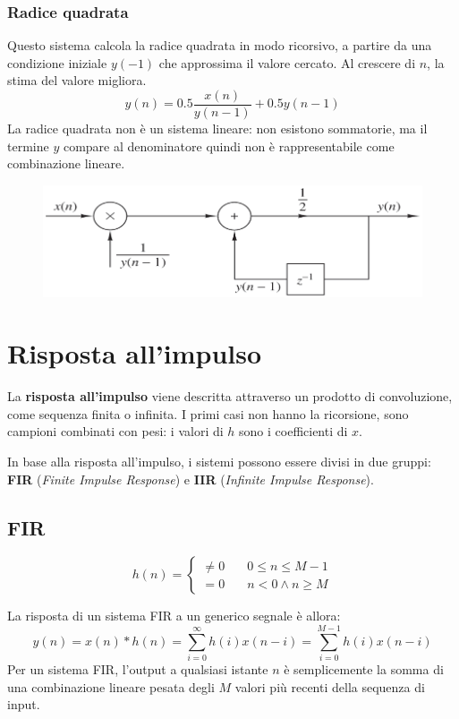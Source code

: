 \newpage
\subsubsection{Radice quadrata}
Questo sistema calcola la radice quadrata in modo ricorsivo, a partire da una condizione iniziale $y(-1)$ che approssima il valore cercato. Al crescere di $n$, la stima del valore migliora.
$$y(n) = 0.5 \frac{x(n)}{y(n-1)} + 0.5y(n-1)$$
La radice quadrata non è un sistema lineare: non esistono sommatorie, ma il termine $y$ compare al denominatore quindi non è rappresentabile come combinazione lineare. 

\begin{figure}[h]
	\centering
	\includegraphics[scale=0.3]{Lezioni/Immagini/radice}
\end{figure}

\section{Risposta all'impulso}
La \textbf{risposta all'impulso} viene descritta attraverso un prodotto di convoluzione, come sequenza finita o infinita. I primi casi non hanno la ricorsione, sono campioni combinati con pesi: i valori di $h$ sono i coefficienti di $x$.

In base alla risposta all'impulso, i sistemi possono essere divisi in due gruppi: \textbf{FIR} (\textit{Finite Impulse Response}) e \textbf{IIR} (\textit{Infinite Impulse Response}). 

\subsection{FIR}
$$h(n) = \begin{cases}
\neq 0 & \quad 0 \leq n \leq M - 1 \\
= 0 & \quad n < 0 \land n \geq M
\end{cases}$$

La risposta di un sistema FIR a un generico segnale è allora:
$$y(n) = x(n) * h(n) = \sum_{i = 0}^{\infty} h(i)x(n - i) = \sum_{i = 0}^{M-1} h(i) x(n - i)$$
Per un sistema FIR, l'output a qualsiasi istante $n$ è semplicemente la somma di una combinazione lineare pesata degli $M$ valori più recenti della sequenza di input.

